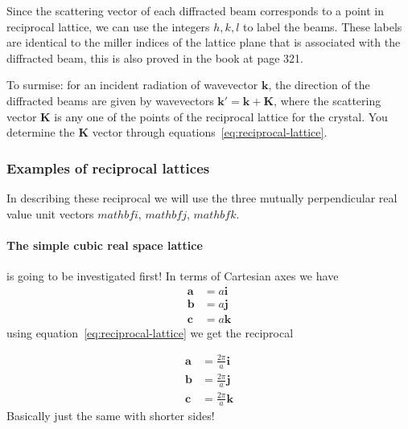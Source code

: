 \documentclass[11pt]{article}
\begin{document}
Since the scattering vector of each diffracted beam corresponds to a point in reciprocal lattice, we can use the integers $h,k,l$ to label the beams. These labels are identical to the miller indices of the lattice plane that is associated with the diffracted beam, this is also proved in the book at page 321.   

To surmise: for an incident radiation of wavevector $\mathbf{k}$, the direction of the diffracted beams are given by wavevectors $\mathbf{k'} = \mathbf{k} + \mathbf{K}$, where the scattering vector $\mathbf{K}$ is any one of the points of the reciprocal lattice for the crystal. You determine the $\mathbf{K}$ vector through equations~\ref{eq:reciprocal-lattice}.

\subsubsection{Examples of reciprocal lattices}
In describing these reciprocal we will use the three mutually perpendicular real value unit vectors $mathbf{i}$, $mathbf{j}$, $mathbf{k}$.
\paragraph{The simple cubic real space lattice} is going to be investigated first!
In terms of Cartesian axes we have 
\begin{align}
	\mathbf{a} &= a\mathbf{i} \nonumber\\
	\mathbf{b} &= a\mathbf{j} \nonumber\\
	\mathbf{c} &= a\mathbf{k} 
\end{align}
using equation~\ref{eq:reciprocal-lattice} we get the reciprocal

\begin{align}
	\mathbf{a} &= \frac{2\pi}{a}\mathbf{i} \nonumber\\
	\mathbf{b} &= \frac{2\pi}{a}\mathbf{j} \nonumber\\
	\mathbf{c} &= \frac{2\pi}{a}\mathbf{k}  
\end{align}
Basically just the same with shorter sides!

\newpage
\end{document}
